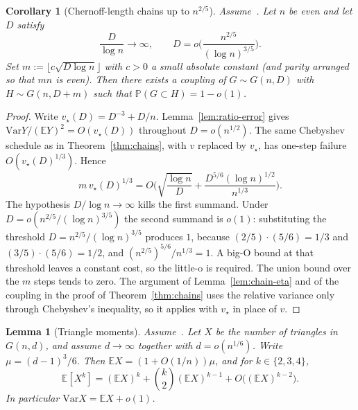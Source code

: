\documentclass[11pt]{article}
\newtheorem{lemma}[theorem]{Lemma}
\newtheorem{corollary}[theorem]{Corollary}
\newcommand{\Gnd}{G(n,d)}
\newcommand{\EE}{\mathbb{E}}
\newcommand{\PP}{\mathbb{P}}
\newcommand{\Var}{\mathrm{Var}}
\begin{document}
\begin{corollary}[Chernoff-length chains up to \(n^{2/5}\)]
\label{cor:chernoff-two-fifths}
Assume~\cite[Theorem~6]{Gao20}.
Let \(n\) be even and let \(D\) satisfy
\[
\frac{D}{\log n}\to\infty,
\qquad
D=o\Biggl(\frac{n^{2/5}}{(\log n)^{3/5}}\Biggr).
\]
Set \(m:=\lfloor c\sqrt{D\log n}\rfloor\) with \(c>0\) a small absolute constant
(and parity arranged so that \(mn\) is even).
Then there exists a coupling of \(G\sim G(n,D)\) with \(H\sim G(n,D+m)\) such that
\(\PP(G\subset H)=1-o(1)\).
\end{corollary}

\begin{proof}
Write \(v_\star(D)=D^{-3}+D/n\). Lemma~\ref{lem:ratio-error} gives
\(\Var Y/(\EE Y)^2=O(v_\star(D))\) throughout \(D=o(n^{1/2})\).
The same Chebyshev schedule as in Theorem~\ref{thm:chains}, with \(v\) replaced by
\(v_\star\), has one-step failure \(O(v_\star(D)^{1/3})\). Hence
\[
m\,v_\star(D)^{1/3}
=
O\Biggl(
\sqrt{\frac{\log n}{D}}
+
\frac{D^{5/6}(\log n)^{1/2}}{n^{1/3}}
\Biggr).
\]
The hypothesis \(D/\log n\to\infty\) kills the first summand.
Under \(D=o(n^{2/5}/(\log n)^{3/5})\) the second summand is \(o(1)\):
substituting the threshold \(D=n^{2/5}/(\log n)^{3/5}\) produces \(1\), because
\((2/5)\cdot(5/6)=1/3\) and \((3/5)\cdot(5/6)=1/2\), and
\((n^{2/5})^{5/6}/n^{1/3}=1\).
A big-O bound at that threshold leaves a constant cost, so the little-o is required.
The union bound over the \(m\) steps tends to zero.
The argument of Lemma~\ref{lem:chain-eta} and of the coupling in the proof of
Theorem~\ref{thm:chains} uses the relative variance only through Chebyshev's
inequality, so it applies with \(v_\star\) in place of \(v\).
\end{proof}

\begin{lemma}[Triangle moments]
\label{lem:tri-moments}
Assume~\cite[Theorem~2]{Gao20}. Let \(X\) be the number of triangles in \(\Gnd\),
and assume \(d\to\infty\) together with \(d=o(n^{1/6})\). Write \(\mu=(d-1)^3/6\).
Then \(\EE X=(1+O(1/n))\mu\), and for \(k\in\{2,3,4\}\),
\[
\EE[X^k]
=
(\EE X)^k+\binom{k}{2}(\EE X)^{k-1}+O\bigl((\EE X)^{k-2}\bigr).
\]
In particular \(\Var X=\EE X+o(1)\).
\end{lemma}
\end{document}

